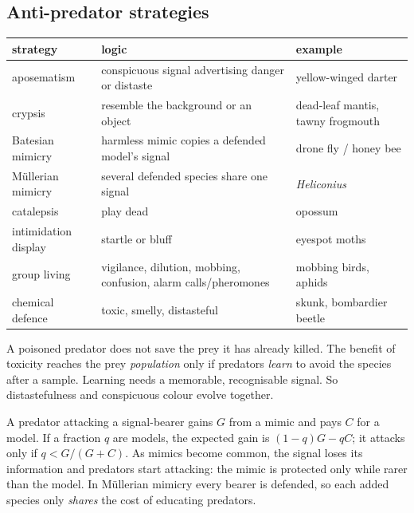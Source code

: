 \subsection{Anti-predator strategies}
\begin{center}\small
\begin{tabularx}{\textwidth}{lXl}
\toprule
strategy & logic & example\\\midrule
aposematism & conspicuous signal advertising danger or distaste & yellow-winged darter\\
crypsis & resemble the background or an object & dead-leaf mantis, tawny frogmouth\\
Batesian mimicry & harmless mimic copies a defended model's signal & drone fly / honey bee\\
Müllerian mimicry & several defended species share one signal & \emph{Heliconius}\\
catalepsis & play dead & opossum\\
intimidation display & startle or bluff & eyespot moths\\
group living & vigilance, dilution, mobbing, confusion, alarm calls/pheromones & mobbing birds, aphids\\
chemical defence & toxic, smelly, distasteful & skunk, bombardier beetle\\\bottomrule
\end{tabularx}
\end{center}

\begin{chain}
A poisoned predator does not save the prey it has already killed. The benefit of toxicity reaches the prey
\emph{population} only if predators \emph{learn} to avoid the species after a sample. Learning needs a memorable,
recognisable signal. So distastefulness and conspicuous colour evolve together.
\end{chain}

\begin{chain}
A predator attacking a signal-bearer gains $G$ from a mimic and pays $C$ for a model. If a fraction $q$ are models, the
expected gain is $(1-q)G-qC$; it attacks only if $q<G/(G+C)$. As mimics become common, the signal loses its
information and predators start attacking: the mimic is protected only while rarer than the model. In Müllerian
mimicry every bearer is defended, so each added species only \emph{shares} the cost of educating predators.
\end{chain}

